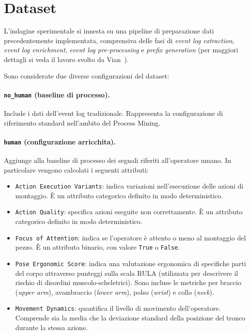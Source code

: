 \section{Dataset}
\label{sec:dataset}
L'indagine sperimentale si innesta su una pipeline di preparazione dati precedentemente implementata, comprensiva delle fasi di \textit{event log extraction}, \textit{event log enrichment}, \textit{event log pre-processing} e \textit{prefix generation} (per maggiori dettagli si veda il lavoro svolto da Vian~\cite{ppm-human-centered-vian2024}).

Sono considerate due diverse configurazioni del dataset:

\paragraph{\texttt{no\_human} (baseline di processo).}
Include i dati dell'event log tradizionale. Rappresenta la configurazione di riferimento standard nell'ambito del Process Mining.

\paragraph{\texttt{human} (configurazione arricchita).}
Aggiunge alla baseline di processo dei segnali riferiti all'operatore umano. In particolare vengono calcolati i seguenti attributi:
\begin{itemize}
    \item \texttt{Action Execution Variants}: indica variazioni nell'esecuzione delle azioni di montaggio. È un attributo categorico definito in modo deterministico.
    \item \texttt{Action Quality}: specifica azioni eseguite non correttamente. È un attributo categorico definito in modo deterministico.
    \item \texttt{Focus of Attention}: indica se l'operatore è attento o meno al montaggio del pezzo. È un attributo binario, con valore \texttt{True} o \texttt{False}.
    \item \texttt{Pose Ergonomic Score}: indica una valutazione ergonomica di specifiche parti del corpo attraverso punteggi sulla scala RULA (utilizzata per descrivere il rischio di disordini muscolo-scheletrici). Sono incluse le metriche per braccio (\textit{upper arm}), avambraccio (\textit{lower arm}), polso (\textit{wrist}) e collo (\textit{neck}).
    \item \texttt{Movement Dynamics}: quantifica il livello di movimento dell'operatore. Comprende sia la media che la deviazione standard della posizione del tronco durante la stessa azione.
\end{itemize}

